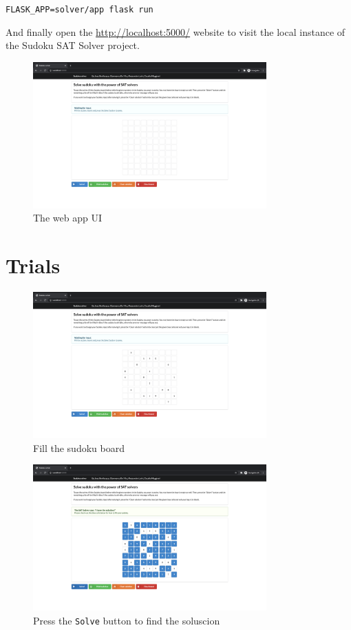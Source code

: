 \documentclass[]{usiinfprospectus}
\begin{document}
\begin{center}
\texttt{FLASK\_APP=solver/app flask run}
\end{center}

\noindent
And finally open the \url{http://localhost:5000/} website to visit the local
instance of the Sudoku SAT Solver project.

\begin{figure}[ht]
\caption{The web app UI}
\centering
\includegraphics[width=0.8\textwidth]{pics/app_ui.png}
\end{figure}

\newpage

\section{Trials}\label{trials}

\begin{figure}[ht]
\caption{Fill the sudoku board}
\centering
\includegraphics[width=0.8\textwidth]{pics/fill_board.png}
\end{figure}

\begin{figure}[ht]
\caption{Press the \texttt{Solve} button to find the soluscion}
\centering
\includegraphics[width=0.8\textwidth]{pics/solved.png}
\end{figure}
\end{document}
